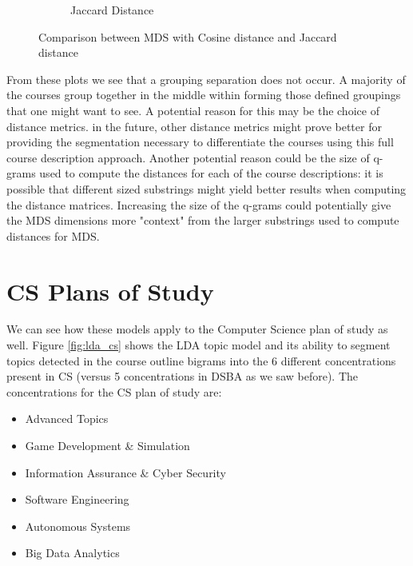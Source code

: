 \begin{figure}[H]
\begin{subfigure}{.5\textwidth}
  \caption{Jaccard Distance}
  \label{fig:jmds}
\end{subfigure}
\caption{Comparison between MDS with Cosine distance and Jaccard distance}
\label{fig:tile2}
\end{figure}

From these plots we see that a grouping separation does not occur.  A majority of the courses group together in the middle within forming those defined groupings that one might want to see. A potential reason for this may be the choice of distance metrics. in the future, other distance metrics might prove better for providing the segmentation necessary to differentiate the courses using this full course description approach.  Another potential reason could be the size of q-grams used to compute the distances for each of the course descriptions: it is possible that different sized substrings might yield better results when computing the distance matrices. Increasing the size of the q-grams could potentially give the MDS dimensions more "context" from the larger substrings used to compute distances for MDS. 





\section{CS Plans of Study}

We can see how these models apply to the Computer Science plan of study as well. Figure \ref{fig:lda_cs} shows the LDA topic 
model and its ability to segment topics detected in the course outline bigrams into the 6 different concentrations present in CS (versus 5 concentrations in DSBA as we saw before). 
The concentrations for the CS plan of study are: 

\begin{itemize}
  \item Advanced Topics  
  \item Game Development \& Simulation  
  \item Information Assurance \& Cyber Security  
  \item Software Engineering   
  \item Autonomous Systems  
  \item Big Data Analytics  
\end{itemize}

